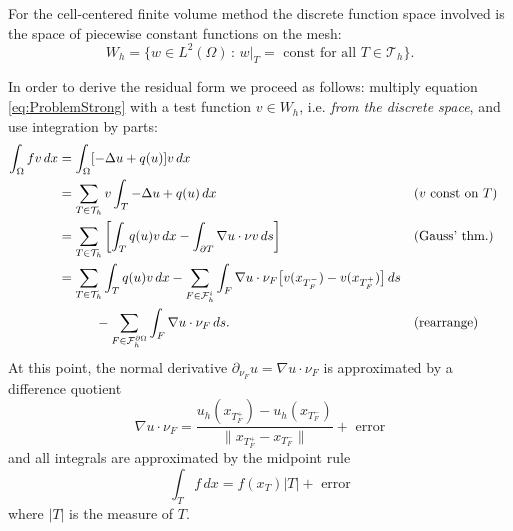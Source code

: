 \documentclass[a4paper,12pt]{article}
\begin{document}
For the cell-centered finite volume method the discrete function space involved 
is the space of piecewise constant functions on the mesh:
\begin{equation*}
W_h = \{w\in L^2(\Omega) \,:\,  \text{$w|_T=$ const for all $T\in\mathcal{T}_h$}\} .
\end{equation*}

In order to derive the residual form we proceed as follows: multiply 
equation \eqref{eq:ProblemStrong} with a test function $v\in W_h$, i.e. \textit{from 
the discrete space}, and use integration by parts:
\begin{align*}
\int_{\Omega} f v \,dx &= \int_{\Omega} [-\Delta u + q(u)] v\,dx\\
&= \sum_{T\in\mathcal{T}_h} v \int_T -\Delta u + q(u) \,dx &&\text{($v$ const on $T$)}\\
&= \sum_{T\in\mathcal{T}_h} \left[\int_T q(u) v \,dx - \int_{\partial T} \nabla u \cdot \nu v \,ds
\right] &&\text{(Gauss' thm.)} \\
&= \sum_{T\in\mathcal{T}_h} \int_T q(u) v \,dx
-\sum_{F\in\mathcal{F}_h^i} \int_F \nabla u \cdot \nu_F \bigl[v(x_{T_F^-}) - v(x_{T_F^+})\bigr] \,ds \\
& \hspace{10mm}-\sum_{F\in\mathcal{F}_h^{\partial\Omega}} \int_F \nabla u \cdot \nu_F \,ds .
&&\text{(rearrange)}
\end{align*}
At this point, the normal derivative $\partial_{\nu_F} u = \nabla u\cdot \nu_F$
is approximated by a difference quotient
\begin{equation*}
\nabla u\cdot \nu_F = \frac{u_h(x_{T_F^+})-u_h(x_{T_F^-})}{\|x_{T_F^+} - x_{T_F^-}\|}
 + \text{ error}
\end{equation*}
and all integrals are approximated by the midpoint rule
\begin{equation*}
\int_T f \,dx = f(x_T)|T| + \text{ error}
\end{equation*}
where $|T|$ is the measure of $T$.
\end{document}
